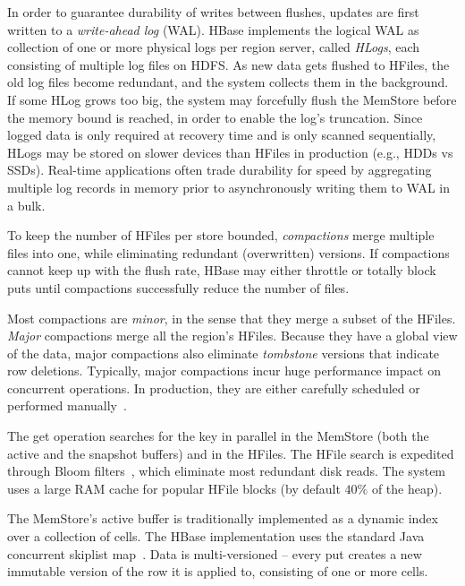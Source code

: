 In order to guarantee durability of writes between flushes, updates are first written to 
a \emph{write-ahead log} (WAL). HBase implements the logical WAL as collection of one or more physical 
logs per region server, called \emph{HLogs}, each consisting of multiple log files on HDFS. 
As new data gets flushed to HFiles, the old log files become redundant, and the system collects 
them in the background. 
If some HLog grows too big, the system may forcefully
flush the MemStore before the memory bound is reached, in order to enable the log's truncation. 
Since logged data is only required at recovery time and is only scanned sequentially, HLogs
may be stored on slower devices than HFiles in production (e.g., HDDs vs SSDs). 
Real-time applications often trade durability for speed by aggregating multiple log records 
in memory prior to asynchronously writing them to WAL in a bulk. 

To keep the number of HFiles per store bounded, \emph{compactions} merge multiple files 
into one, while eliminating redundant (overwritten) versions. If compactions cannot keep up
with the flush rate, HBase may either throttle or totally block  puts until  compactions 
successfully reduce the number of files. 

Most compactions are \emph{minor}, 
in the sense that they merge a subset of the HFiles. \emph{Major} compactions merge all the region's 
HFiles. Because they have a global view of the data, major compactions also eliminate 
{\em tombstone} versions that indicate row deletions. Typically, major compactions incur huge 
performance impact on concurrent operations. In production, they are either carefully scheduled 
or performed manually~\cite{hbasetuning}.

The get operation searches for the key in parallel in the MemStore (both the active and the 
snapshot buffers) and in the HFiles. The HFile search  is expedited through Bloom 
filters~\cite{Chang2008}, which eliminate most redundant disk reads. The system 
uses a large RAM cache for popular HFile blocks (by default $40\%$ of the heap).

The MemStore's active buffer is traditionally implemented as a dynamic index over a collection of cells.  
The HBase implementation uses the standard Java concurrent skiplist map~\cite{javaskiplist}.
Data is multi-versioned -- every put creates a new immutable version of the row it is applied to, 
consisting of one or more cells. 

